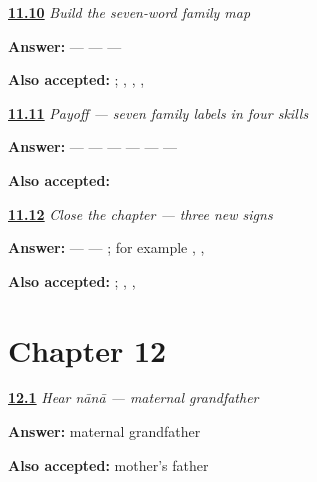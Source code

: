 \noindent\begin{minipage}[t]{\linewidth}
\raggedright
\hyperlink{review-MW-R08-family-map-four}{\textbf{11.10}} \emph{Build the seven-word family map}\par
\small \textbf{Answer:}  —  —  — \par
\footnotesize \textbf{Also accepted:}    ; , , , 
\end{minipage}\par\medskip

\noindent\begin{minipage}[t]{\linewidth}
\raggedright
\hyperlink{review-MW-C08-family-seven-payoff}{\textbf{11.11}} \emph{Payoff — seven family labels in four skills}\par
\small \textbf{Answer:}  —  —  —  —  —  — \par
\footnotesize \textbf{Also accepted:}       
\end{minipage}\par\medskip

\noindent\begin{minipage}[t]{\linewidth}
\raggedright
\hyperlink{review-MW-R08-script-close-three}{\textbf{11.12}} \emph{Close the chapter — three new signs}\par
\small \textbf{Answer:}  —  — ; for example , , \par
\footnotesize \textbf{Also accepted:}   ; , , 
\end{minipage}\par\medskip

\section*{Chapter 12}

\noindent\begin{minipage}[t]{\linewidth}
\raggedright
\hyperlink{review-MW-C09-hear-nana-meaning}{\textbf{12.1}} \emph{Hear \emph{nānā} — maternal grandfather}\par
\small \textbf{Answer:} maternal grandfather\par
\footnotesize \textbf{Also accepted:} mother's father
\end{minipage}\par\medskip

